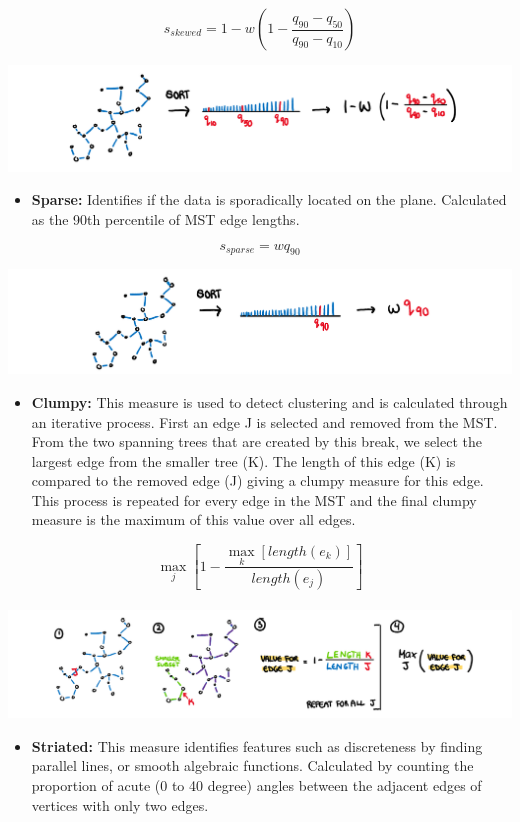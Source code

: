 \[s_{skewed} = 1-w(1-\frac{q_{90}-{q_{50}}}{q_{90}-q_{10}})\]

\includegraphics{figures/drawskewed.png}

\begin{itemize}
\tightlist
\item
  \textbf{Sparse:} Identifies if the data is sporadically located on the
  plane. Calculated as the 90th percentile of MST edge lengths.
\end{itemize}

\[s_{sparse}= wq_{90}\]

\includegraphics{figures/drawsparse.png}

\begin{itemize}
\tightlist
\item
  \textbf{Clumpy:} This measure is used to detect clustering and is
  calculated through an iterative process. First an edge J is selected
  and removed from the MST. From the two spanning trees that are created
  by this break, we select the largest edge from the smaller tree (K).
  The length of this edge (K) is compared to the removed edge (J) giving
  a clumpy measure for this edge. This process is repeated for every
  edge in the MST and the final clumpy measure is the maximum of this
  value over all edges.
\end{itemize}

\[\max_{j}[1-\frac{\max_{k}[length(e_k)]}{length(e_j)}]\]\\
\includegraphics{figures/drawclumpy.png}

\begin{itemize}
\tightlist
\item
  \textbf{Striated:} This measure identifies features such as
  discreteness by finding parallel lines, or smooth algebraic functions.
  Calculated by counting the proportion of acute (0 to 40 degree) angles
  between the adjacent edges of vertices with only two edges.
\end{itemize}

